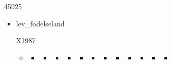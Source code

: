 \documentclass[
]{book}
\begin{document}
\begin{itemize}
\begin{itemize}
\begin{itemize}
\begin{itemize}
\begin{itemize}
\begin{itemize}
\begin{itemize}
\begin{itemize}
\begin{itemize}
\begin{itemize}
                    45925

                    \begin{itemize}
                    \item
                      lev\_fodelseland

                      X1987

                      \begin{itemize}
                      \item
                        \begin{itemize}
                        \item
                          \begin{itemize}
                          \item
                            \begin{itemize}
                            \item
                              \begin{itemize}
                              \item
                                \begin{itemize}
                                \item
                                  \begin{itemize}
                                  \item
                                    \begin{itemize}
                                    \item
                                      \begin{itemize}
                                      \item
                                        \begin{itemize}
                                        \item
                                          \begin{itemize}
                                          \item
                                            \begin{itemize}
                                            \item
                                              \begin{itemize}
                                              \item
                                                \begin{itemize}

\end{itemize}
\end{itemize}
\end{itemize}
\end{itemize}
\end{itemize}
\end{itemize}
\end{itemize}
\end{itemize}
\end{itemize}
\end{itemize}
\end{itemize}
\end{itemize}
\end{itemize}
\end{itemize}
\end{itemize}
\end{itemize}
\end{itemize}
\end{itemize}
\end{itemize}
\end{itemize}
\end{itemize}
\end{itemize}
\end{itemize}
\end{itemize}
\end{itemize}
\end{document}
